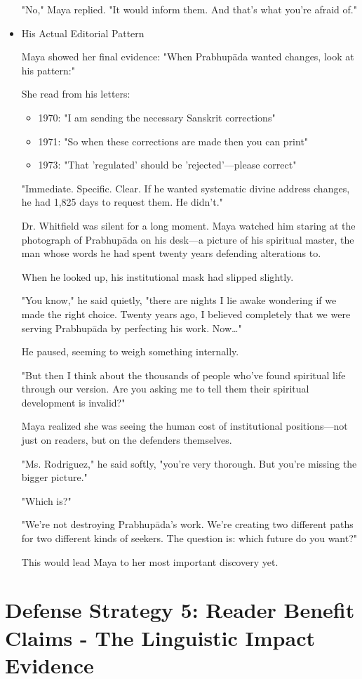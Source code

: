 \documentclass[11pt,twoside]{book}
\begin{document}
\begin{itemize}
"No," Maya replied. "It would inform them. And that's what you're afraid of."
\item His Actual Editorial Pattern
\label{sec:orgb4cbc92}

Maya showed her final evidence: "When Prabhupāda wanted changes, look at his pattern:"

She read from his letters:
\begin{itemize}
\item 1970: "I am sending the necessary Sanskrit corrections"
\item 1971: "So when these corrections are made then you can print"
\item 1973: "That 'regulated' should be 'rejected'—please correct"
\end{itemize}

"Immediate. Specific. Clear. If he wanted systematic divine address changes, he had 1,825 days to request them. He didn't."

Dr. Whitfield was silent for a long moment. Maya watched him staring at the photograph of Prabhupāda on his desk—a picture of his spiritual master, the man whose words he had spent twenty years defending alterations to.

When he looked up, his institutional mask had slipped slightly. 

"You know," he said quietly, "there are nights I lie awake wondering if we made the right choice. Twenty years ago, I believed completely that we were serving Prabhupāda by perfecting his work. Now\ldots{}"

He paused, seeming to weigh something internally.

"But then I think about the thousands of people who've found spiritual life through our version. Are you asking me to tell them their spiritual development is invalid?"

Maya realized she was seeing the human cost of institutional positions—not just on readers, but on the defenders themselves.

"Ms. Rodriguez," he said softly, "you're very thorough. But you're missing the bigger picture."

"Which is?"

"We're not destroying Prabhupāda's work. We're creating two different paths for two different kinds of seekers. The question is: which future do you want?"

This would lead Maya to her most important discovery yet.
\end{itemize}
\section*{Defense Strategy 5: Reader Benefit Claims - The Linguistic Impact Evidence}
\label{sec:org5f71e22}
\end{document}

